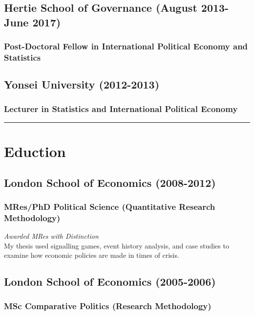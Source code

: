 \documentclass[a4paper]{article}
\begin{document}
\subsection*{Hertie School of Governance (August 2013-June 2017)}

\subsubsection*{Post-Doctoral Fellow in International Political Economy and Statistics}

\subsection*{Yonsei University (2012-2013)}
\subsubsection*{Lecturer in Statistics and International Political Economy}

\vspace{0.25cm}
\medskip\hrule height 1pt
\vspace{0.5cm}


\section*{Eduction}

\subsection*{London School of Economics (2008-2012)}
\subsubsection*{MRes/PhD Political Science (Quantitative Research Methodology)}

\emph{Awarded MRes with Distinction} \\

\noindent My thesis used signalling games, event history analysis, and case studies to examine how economic policies are made in times of crisis.

\subsection*{London School of Economics (2005-2006)}
\subsubsection*{MSc Comparative Politics (Research Methodology)}
\end{document}
